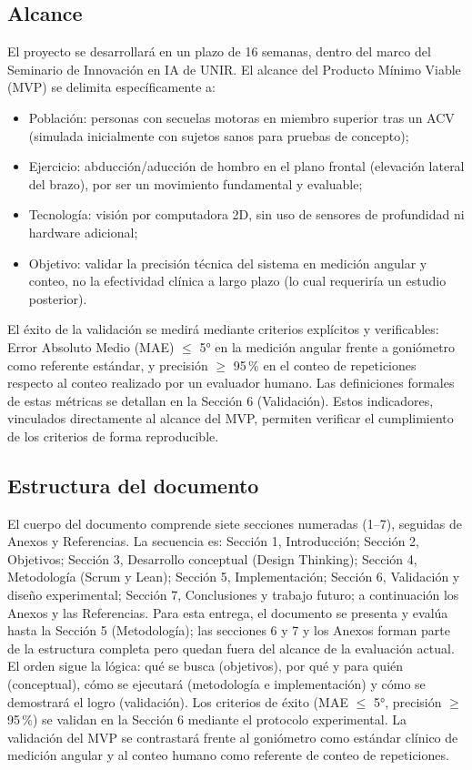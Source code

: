 \documentclass[11pt,a4paper]{article}
\begin{document}
\subsection{Alcance}
El proyecto se desarrollará en un plazo de 16 semanas, dentro del marco del Seminario de Innovación en IA de UNIR. El alcance del Producto Mínimo Viable (MVP) se delimita específicamente a:
\begin{itemize}
  \item Población: personas con secuelas motoras en miembro superior tras un ACV (simulada inicialmente con sujetos sanos para pruebas de concepto);
  \item Ejercicio: abducción/aducción de hombro en el plano frontal (elevación lateral del brazo), por ser un movimiento fundamental y evaluable;
  \item Tecnología: visión por computadora 2D, sin uso de sensores de profundidad ni hardware adicional;
  \item Objetivo: validar la precisión técnica del sistema en medición angular y conteo, no la efectividad clínica a largo plazo (lo cual requeriría un estudio posterior).
\end{itemize}
El éxito de la validación se medirá mediante criterios explícitos y verificables: Error Absoluto Medio (MAE) $\leq$ 5° en la medición angular frente a goniómetro como referente estándar, y precisión $\geq$ 95\,\% en el conteo de repeticiones respecto al conteo realizado por un evaluador humano. Las definiciones formales de estas métricas se detallan en la Sección 6 (Validación). Estos indicadores, vinculados directamente al alcance del MVP, permiten verificar el cumplimiento de los criterios de forma reproducible.

\subsection{Estructura del documento}
El cuerpo del documento comprende siete secciones numeradas (1--7), seguidas de Anexos y Referencias. La secuencia es: Sección 1, Introducción; Sección 2, Objetivos; Sección 3, Desarrollo conceptual (Design Thinking); Sección 4, Metodología (Scrum y Lean); Sección 5, Implementación; Sección 6, Validación y diseño experimental; Sección 7, Conclusiones y trabajo futuro; a continuación los Anexos y las Referencias. Para esta entrega, el documento se presenta y evalúa hasta la Sección 5 (Metodología); las secciones 6 y 7 y los Anexos forman parte de la estructura completa pero quedan fuera del alcance de la evaluación actual. El orden sigue la lógica: qué se busca (objetivos), por qué y para quién (conceptual), cómo se ejecutará (metodología e implementación) y cómo se demostrará el logro (validación). Los criterios de éxito (MAE $\leq$ 5°, precisión $\geq$ 95\,\%) se validan en la Sección 6 mediante el protocolo experimental. La validación del MVP se contrastará frente al goniómetro como estándar clínico de medición angular y al conteo humano como referente de conteo de repeticiones.
\end{document}
